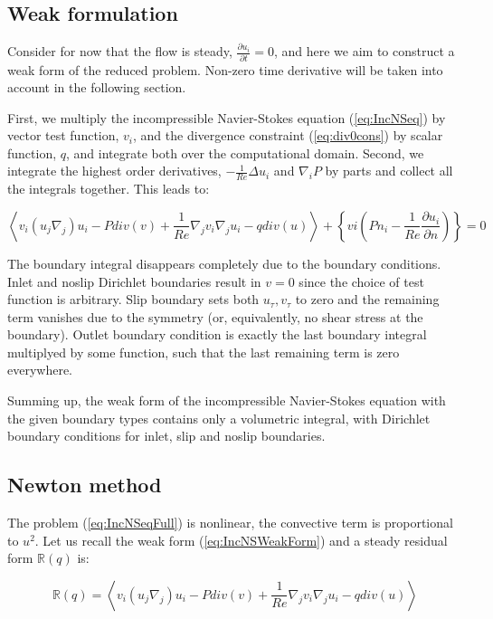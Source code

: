\subsection{Weak formulation}

Consider for now that the flow is steady, $\frac{\partial u_i}{\partial t} = 0$, and here we aim to construct a weak form of the reduced problem. Non-zero time derivative will be taken into account in the following section. 

First, we multiply the incompressible Navier-Stokes equation (\ref{eq:IncNSeq}) by vector test function, $v_i$, and the divergence constraint (\ref{eq:div0cons}) by scalar function, $q$, and integrate both over the computational domain. Second, we integrate the highest order derivatives, $-\frac{1}{Re}\Delta u_i$ and $\nabla_i P$ by parts and collect all the integrals together. This leads to:

\begin{equation}
\label{eq:IncNSWeakForm}
\left<v_i (u_j \nabla_j) u_i - P div(v) + \frac{1}{Re}\nabla_j v_i \nabla_j u_i - q div(u)\right> + \left\{ vi \left( P n_i - \frac{1}{Re} \frac{\partial u_i}{\partial n} \right) \right\} = 0
\end{equation}

The boundary integral disappears completely due to the boundary conditions. Inlet and noslip Dirichlet boundaries result in $v = 0$ since the choice of test function is arbitrary. Slip boundary sets both $u_{\tau}, v_{\tau}$ to zero and the remaining term vanishes due to the symmetry (or, equivalently, no shear stress at the boundary). Outlet boundary condition is exactly the last boundary integral multiplyed by some function, such that the last remaining term is zero everywhere.

Summing up, the weak form of the incompressible Navier-Stokes equation with the given boundary types contains only a volumetric integral, with Dirichlet boundary conditions for inlet, slip and noslip boundaries.

\subsection{Newton method}

The problem (\ref{eq:IncNSeqFull}) is nonlinear, the convective term is proportional to $u^2$. Let us recall the weak form (\ref{eq:IncNSWeakForm}) and a steady residual form $\mathbb{R}(q)$ is:

\begin{equation}
\mathbb{R}(q) = \left<v_i (u_j \nabla_j) u_i - P div(v) + \frac{1}{Re}\nabla_j v_i \nabla_j u_i - q div(u)\right>
\end{equation}


